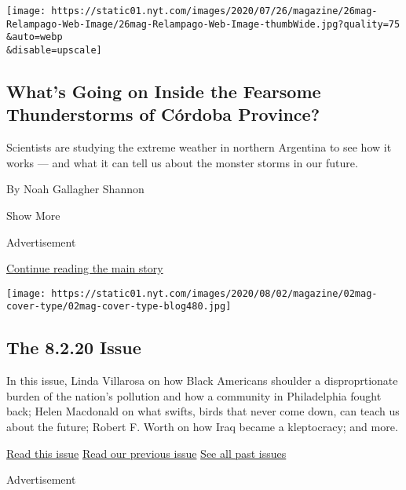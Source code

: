\begin{enumerate}
  \texttt{[image: https://static01.nyt.com/images/2020/07/26/magazine/26mag-Relampago-Web-Image/26mag-Relampago-Web-Image-thumbWide.jpg?quality=75\\\&auto=webp\\\&disable=upscale]}

  \hypertarget{whats-going-on-inside-the-fearsome-thunderstorms-of-cuxf3rdoba-province}{%
  \subsection{What's Going on Inside the Fearsome Thunderstorms of
  Córdoba
  Province?}\label{whats-going-on-inside-the-fearsome-thunderstorms-of-cuxf3rdoba-province}}

  Scientists are studying the extreme weather in northern Argentina to
  see how it works --- and what it can tell us about the monster storms
  in our future.

  By Noah Gallagher Shannon
\end{enumerate}

Show More

Advertisement

\protect\hyperlink{after-mid2}{Continue reading the main story}

\href{https://www.nytimes.com/issue/magazine/2020/07/31/the-8220-issue}{}

\texttt{[image: https://static01.nyt.com/images/2020/08/02/magazine/02mag-cover-type/02mag-cover-type-blog480.jpg]}

\href{https://www.nytimes.com/issue/magazine/2020/07/31/the-8220-issue}{}

\hypertarget{the-8220-issue}{%
\subsection{The 8.2.20 Issue}\label{the-8220-issue}}

In this issue, Linda Villarosa on how Black Americans shoulder a
disproprtionate burden of the nation's pollution and how a community in
Philadelphia fought back; Helen Macdonald on what swifts, birds that
never come down, can teach us about the future; Robert F. Worth on how
Iraq became a kleptocracy; and more.

\href{https://www.nytimes.com/issue/magazine/2020/07/31/the-8220-issue}{Read
this issue}
\href{https://www.nytimes.com/issue/magazine/2020/07/24/the-72620-issue}{Read
our previous issue}
\href{https://www.nytimes.com/interactive/2020/07/02/magazine/past-issues-sunday-magazine.html}{See
all past issues}

Advertisement

